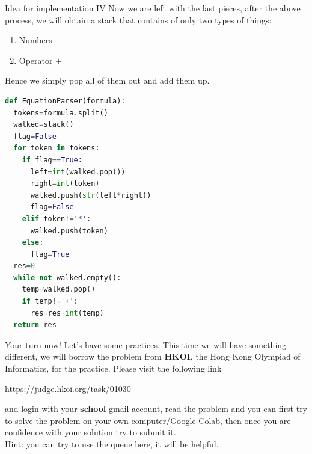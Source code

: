 \documentclass[10pt,xcolor={table,dvipsnames},t]{beamer}
\begin{document}
\begin{frame}{Idea for implementation IV}
  Now we are left with the last pieces, after the above process, we will obtain a stack that contains of only two types of things:
  \begin{enumerate}
    \item Numbers
    \item Operator $+$
  \end{enumerate}
  Hence we simply pop all of them out and add them up.
\end{frame}

\begin{frame}[fragile]
\begin{lstlisting}[language=python]
def EquationParser(formula):
  tokens=formula.split()
  walked=stack()
  flag=False
  for token in tokens:
    if flag==True:
      left=int(walked.pop())
      right=int(token)
      walked.push(str(left*right))
      flag=False
    elif token!='*':
      walked.push(token)
    else:
      flag=True
  res=0
  while not walked.empty():
    temp=walked.pop()
    if temp!='+':
      res=res+int(temp)
  return res
\end{lstlisting}
\end{frame}

\begin{frame}{Your turn now!}
  Let's have some practices. This time we will have something different, we will borrow the problem from \textbf{HKOI}, the Hong Kong Olympiad of Informatics, for the practice. Please visit the following link
  \begin{center}
    https://judge.hkoi.org/task/01030
  \end{center}
  and login with your \textbf{school} gmail account, read the problem and you can first try to solve the problem on your own computer/Google Colab, then once you are confidence with your solution try to submit it. \\
  Hint: you can try to use the queue here, it will be helpful.
\end{frame}
\end{document}
